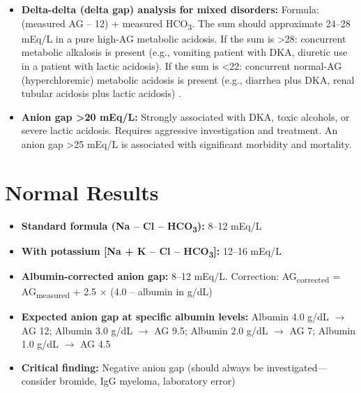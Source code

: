 \begin{itemize}
  \item \textbf{Delta-delta (delta gap) analysis for mixed disorders:} Formula: (measured AG -- 12) + measured HCO\textsubscript{3}. The sum should approximate 24--28 mEq/L in a pure high-AG metabolic acidosis. If the sum is >28: concurrent metabolic alkalosis is present (e.g., vomiting patient with DKA, diuretic use in a patient with lactic acidosis). If the sum is <22: concurrent normal-AG (hyperchloremic) metabolic acidosis is present (e.g., diarrhea plus DKA, renal tubular acidosis plus lactic acidosis) \cite{wrenn1990delta}.
  \item \textbf{Anion gap >20 mEq/L:} Strongly associated with DKA, toxic alcohols, or severe lactic acidosis. Requires aggressive investigation and treatment. An anion gap >25 mEq/L is associated with significant morbidity and mortality.
\end{itemize}

\section*{Normal Results}
\begin{itemize}
  \item \textbf{Standard formula (Na -- Cl -- HCO\textsubscript{3}):} 8--12 mEq/L
  \item \textbf{With potassium [Na + K -- Cl -- HCO\textsubscript{3}]:} 12--16 mEq/L
  \item \textbf{Albumin-corrected anion gap:} 8--12 mEq/L. Correction: AG\textsubscript{corrected} = AG\textsubscript{measured} + 2.5 $\times$ (4.0 -- albumin in g/dL)
  \item \textbf{Expected anion gap at specific albumin levels:} Albumin 4.0 g/dL $\rightarrow$ AG 12; Albumin 3.0 g/dL $\rightarrow$ AG 9.5; Albumin 2.0 g/dL $\rightarrow$ AG 7; Albumin 1.0 g/dL $\rightarrow$ AG 4.5
  \item \textbf{Critical finding:} Negative anion gap (should always be investigated---consider bromide, IgG myeloma, laboratory error)
\end{itemize}

